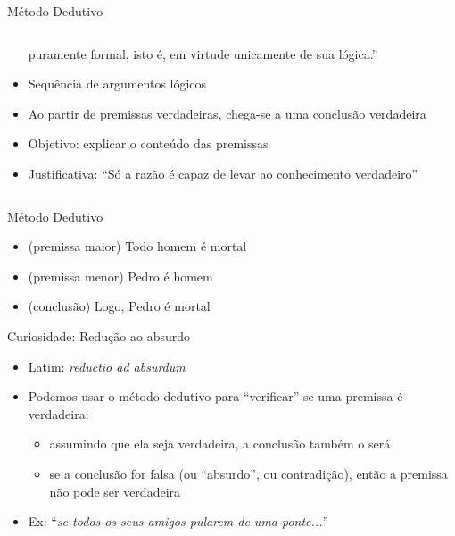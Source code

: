 \documentclass{beamer}
\begin{document}
\begin{frame}{Método Dedutivo}
\begin{columns}
\begin{column}{7.5cm}
\begin{itemize}
        puramente formal, isto é, em virtude unicamente de sua
        lógica.''
      \item Sequência de argumentos lógicos
      \item Ao partir de premissas verdadeiras, chega-se a uma
        conclusão verdadeira
      \item Objetivo: explicar o conteúdo das premissas
      \item Justificativa: ``Só a razão é capaz de levar ao
        conhecimento verdadeiro''
      \end{itemize}
  \end{column}
\end{columns}
\end{frame}

\begin{frame}{Método Dedutivo}
  \begin{example}
    \begin{itemize}
    \item (premissa maior) Todo homem é mortal
    \item (premissa menor) Pedro é homem
    \item (conclusão) Logo, Pedro é mortal
    \end{itemize}
  \end{example}
\end{frame}

\begin{frame}{Curiosidade: Redução ao absurdo}
  \begin{itemize}
  \item Latim: {\em reductio ad absurdum}
  \item Podemos usar o método dedutivo para ``verificar'' se uma
    premissa é verdadeira:
    \begin{itemize}
    \item assumindo que ela seja verdadeira, a conclusão também o será
    \item se a conclusão for falsa (ou ``absurdo'', ou contradição),
      então a premissa não pode ser verdadeira
    \end{itemize}
  \item Ex: ``{\em se todos os seus amigos pularem de uma ponte...}''
  \end{itemize}
\end{frame}

\end{document}
